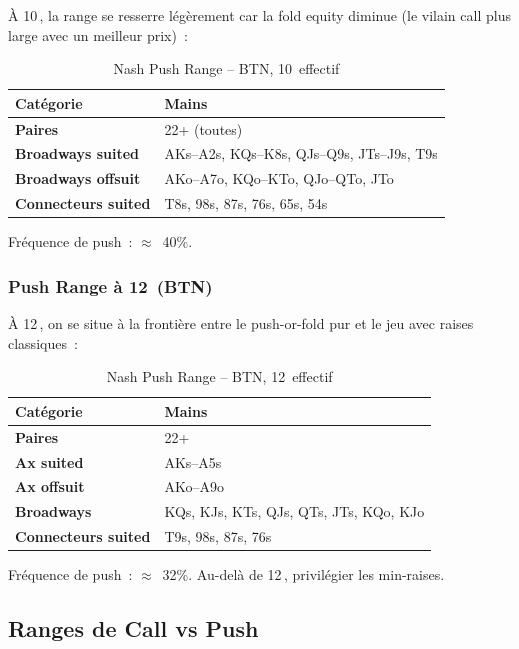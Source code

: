 \documentclass[a4paper,11pt]{article}
\newcommand{\bb}{\,\mathrm{bb}}
\begin{document}
\`A 10\bb, la range se resserre l\'eg\`erement car la fold equity diminue (le vilain call plus large avec un meilleur prix)~:

\begin{table}[H]
\centering
\caption{Nash Push Range -- BTN, 10\bb{} effectif}
\label{tab:nash_10bb}
\small
\begin{tabular}{l l}
\toprule
\textbf{Cat\'egorie} & \textbf{Mains} \\
\midrule
\textbf{Paires} & 22+ (toutes) \\
\textbf{Broadways suited} & AKs--A2s, KQs--K8s, QJs--Q9s, JTs--J9s, T9s \\
\textbf{Broadways offsuit} & AKo--A7o, KQo--KTo, QJo--QTo, JTo \\
\textbf{Connecteurs suited} & T8s, 98s, 87s, 76s, 65s, 54s \\
\bottomrule
\end{tabular}

\medskip
\footnotesize
Fr\'equence de push~: $\approx$~40\%.
\end{table}

\subsubsection{Push Range \`a 12\bb{} (BTN)}

\`A 12\bb, on se situe \`a la fronti\`ere entre le push-or-fold pur et le jeu avec raises classiques~:

\begin{table}[H]
\centering
\caption{Nash Push Range -- BTN, 12\bb{} effectif}
\label{tab:nash_12bb}
\small
\begin{tabular}{l l}
\toprule
\textbf{Cat\'egorie} & \textbf{Mains} \\
\midrule
\textbf{Paires} & 22+ \\
\textbf{Ax suited} & AKs--A5s \\
\textbf{Ax offsuit} & AKo--A9o \\
\textbf{Broadways} & KQs, KJs, KTs, QJs, QTs, JTs, KQo, KJo \\
\textbf{Connecteurs suited} & T9s, 98s, 87s, 76s \\
\bottomrule
\end{tabular}

\medskip
\footnotesize
Fr\'equence de push~: $\approx$~32\%. Au-del\`a de 12\bb, privil\'egier les min-raises.
\end{table}

\subsection{Ranges de Call vs Push}
\end{document}
